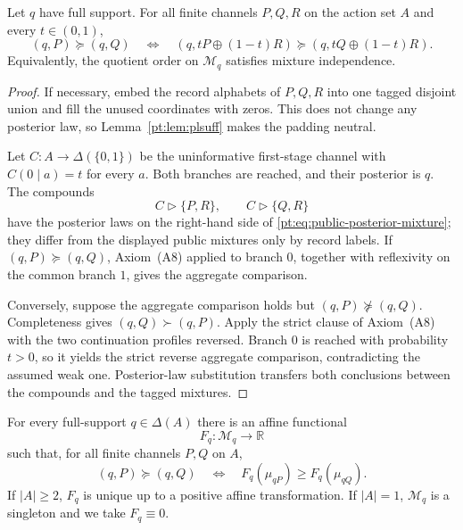\begin{lemma}\label{pt:lem:publiccoin}
Let $q$ have full support.  For all finite channels $P,Q,R$ on the action set
$A$ and every $t\in(0,1)$,
\[
 (q,P)\succeq(q,Q)
 \quad\Longleftrightarrow\quad
 (q,tP\oplus(1-t)R)
 \succeq
 (q,tQ\oplus(1-t)R).
\]
Equivalently, the quotient order on $\mathcal M_q$ satisfies mixture
independence.
\end{lemma}

\begin{proof}
If necessary, embed the record alphabets of $P,Q,R$ into one tagged disjoint
union and fill the unused coordinates with zeros.  This does not change any
posterior law, so Lemma~\ref{pt:lem:plsuff} makes the padding neutral.

Let $C:A\to\Delta(\{0,1\})$ be the uninformative first-stage channel with
$C(0\mid a)=t$ for every $a$.  Both branches are reached, and their posterior
is $q$.  The compounds
\[
 C\triangleright\{P,R\},
 \qquad
 C\triangleright\{Q,R\}
\]
have the posterior laws on the right-hand side of
\eqref{pt:eq:public-posterior-mixture}; they differ from the displayed public
mixtures only by record labels.  If $(q,P)\succeq(q,Q)$, Axiom~\textup{(A8)}
applied to branch $0$, together with reflexivity on the common branch $1$,
gives the aggregate comparison.

Conversely, suppose the aggregate comparison holds but
$(q,P)\not\succeq(q,Q)$.  Completeness gives $(q,Q)\succ(q,P)$.  Apply the
strict clause of Axiom~\textup{(A8)} with the two continuation profiles
reversed.  Branch $0$ is reached with probability $t>0$, so it yields the
strict reverse aggregate comparison, contradicting the assumed weak one.
Posterior-law substitution transfers both conclusions between the compounds
and the tagged mixtures.
\end{proof}

\begin{lemma}\label{pt:lem:postsep}
For every full-support $q\in\Delta(A)$ there is an affine functional
\[
 F_q:\mathcal M_q\longrightarrow\mathbb R
\]
such that, for all finite channels $P,Q$ on $A$,
\begin{equation}
 (q,P)\succeq(q,Q)
 \quad\Longleftrightarrow\quad
 F_q(\mu_{qP})\ge F_q(\mu_{qQ}).
 \label{pt:eq:fibre-representation}
\end{equation}
If $|A|\ge2$, $F_q$ is unique up to a positive affine transformation.  If
$|A|=1$, $\mathcal M_q$ is a singleton and we take $F_q\equiv0$.
\end{lemma}

